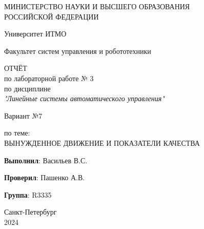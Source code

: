 \thispagestyle{empty}

\begin{center}
    МИНИСТЕРСТВО НАУКИ И ВЫСШЕГО ОБРАЗОВАНИЯ \\ РОССИЙСКОЙ ФЕДЕРАЦИИ

    \vspace{20pt}

    Университет ИТМО

    \vspace{20pt}

    Факультет систем управления и робототехники
\end{center}

\vfill

\begin{center}
    ОТЧЁТ \\  
    по лабораторной работе № 3\\
    по дисциплине \\
    \textit{"Линейные системы автоматического управления"}

    
    \vspace{20pt}
    
    Вариант №7

    \vspace{20pt}

    по теме: \\
    \uppercase{Вынужденное движение и показатели качества}
\end{center}

\vfill
\hfil

    \noindent \hfill \textbf{Выполнил}: Васильев В.С.

    \vspace{20pt}

    \noindent \hfill \textbf{Проверил}: Пашенко А.В.

    \vspace{20pt}

    \noindent \hfill \textbf{Группа}: R3335

\vfill
\hfil

\begin{center}
    Санкт-Петербург \\ 2024
\end{center}